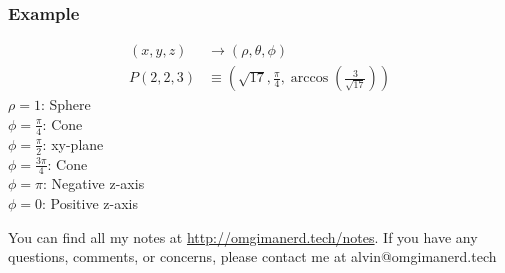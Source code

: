 \documentclass{math}
\begin{document}
\subsubsection*{Example}
\begin{align*}
  (x,y,z) &\to (\rho,\theta,\phi) \\
  P(2,2,3) &\equiv\left(
    \sqrt{17},\frac{\pi}{4},\arccos\left(\frac{3}{\sqrt{17}}\right)\right)
\end{align*}
\( \rho = 1 \): Sphere \\
\( \phi = \frac{\pi}{4} \): Cone \\
\( \phi = \frac{\pi}{2} \): xy-plane \\
\( \phi = \frac{3\pi}{4} \): Cone \\
\( \phi = \pi \): Negative z-axis \\
\( \phi = 0 \): Positive z-axis

\begin{center}
  You can find all my notes at \url{http://omgimanerd.tech/notes}. If you have
  any questions, comments, or concerns, please contact me at
  alvin@omgimanerd.tech
\end{center}
\end{document}
